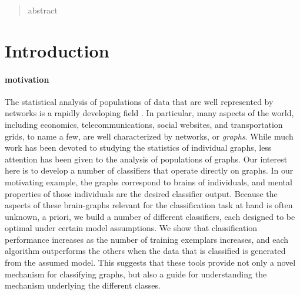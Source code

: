 \documentclass{article}
\begin{document}
 


\begin{abstract} 
abstract
\end{abstract} 

\section{Introduction} %
\label{sec:introduction}


\paragraph{motivation}

The statistical analysis of populations of data that are well represented by networks is a rapidly developing field \cite{??}.  In particular, many aspects of the world, including economics, telecommunications, social websites, and transportation grids, to name a few, are well characterized by networks, or \emph{graphs}. While much work has been devoted to studying the statistics of individual graphs, less attention has been given to the analysis of populations of graphs.  Our interest here is to develop a number of classifiers that operate directly on graphs.  In our motivating example, the graphs correspond to brains of individuals, and mental properties of those individuals are the desired classifier output.  Because the aspects of these brain-graphs relevant for the classification task at hand is often unknown, a priori, we build a number of different classifiers, each designed to be optimal under certain model assumptions.  We show that classification performance increases as the number of training exemplars increases, and each algorithm outperforms the others when the data that is classified is generated from the assumed model.  This suggests that these tools provide not only a novel mechanism for classifying graphs, but also a guide for understanding the mechanism underlying the different classes.  
\end{document}
